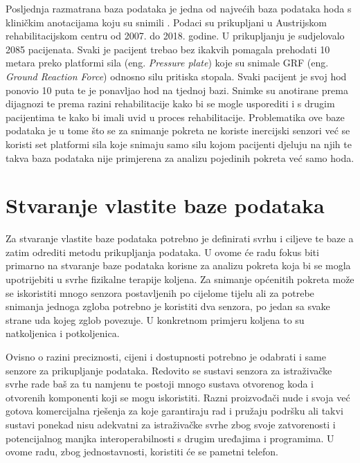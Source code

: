 \documentclass[times, utf8, diplomski]{fer}
\begin{document}
Posljednja razmatrana baza podataka je jedna od najvećih baza podataka hoda s kliničkim anotacijama koju su snimili \cite{pressurePlate}.
Podaci su prikupljani u Austrijskom rehabilitacijskom centru od 2007. do 2018. godine. U prikupljanju je sudjelovalo 2085 pacijenata.
Svaki je pacijent trebao bez ikakvih pomagala prehodati 10 metara preko platformi sila (eng. \textit{Pressure plate}) koje su snimale
GRF (eng. \textit{Ground Reaction Force}) odnosno silu pritiska stopala. Svaki pacijent je svoj hod ponovio 10 puta te je ponavljao
hod na tjednoj bazi. Snimke su anotirane prema dijagnozi te prema razini rehabilitacije kako bi se mogle usporediti i s drugim
pacijentima te kako bi imali uvid u proces rehabilitacije. Problematika ove baze podataka je u tome što se za snimanje pokreta ne
koriste inercijski senzori već se koristi set platformi sila koje snimaju samo silu kojom pacijenti djeluju na njih te takva baza 
podataka nije primjerena za analizu pojedinih pokreta već samo hoda.



\chapter{Stvaranje vlastite baze podataka}
Za stvaranje vlastite baze podataka potrebno je definirati svrhu i ciljeve te baze a zatim odrediti metodu prikupljanja podataka. U ovome će radu
fokus biti primarno na stvaranje baze podataka korisne za analizu pokreta koja bi se mogla upotrijebiti u svrhe fizikalne terapije koljena.
Za snimanje općenitih pokreta može se iskoristiti mnogo senzora postavljenih po cijelome tijelu ali za potrebe snimanja jednoga zgloba potrebno je 
koristiti dva senzora, po jedan sa svake strane uda kojeg zglob povezuje. U konkretnom primjeru koljena to su natkoljenica i potkoljenica.

Ovisno o razini preciznosti, cijeni i dostupnosti potrebno je odabrati i same senzore za prikupljanje podataka. Redovito se sustavi senzora
za istraživačke svrhe rade baš za tu namjenu te postoji mnogo sustava otvorenog koda i otvorenih komponenti koji se mogu iskoristiti. Razni
proizvođači nude i svoja već gotova komercijalna rješenja za koje garantiraju rad i pružaju podršku ali takvi sustavi ponekad nisu adekvatni za
istraživačke svrhe zbog svoje zatvorenosti i potencijalnog manjka interoperabilnosti s drugim uređajima i programima. U ovome radu, zbog jednostavnosti,
koristiti će se pametni telefon.
\end{document}

